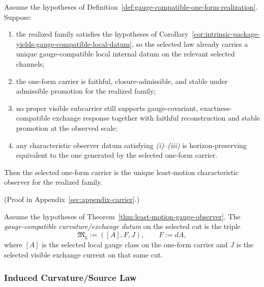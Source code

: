 \begin{theorem}
\label{thm:least-motion-gauge-observer}
Assume the hypotheses of
Definition~\ref{def:gauge-compatible-one-form-realization}. Suppose:
\begin{enumerate}[label=(\roman*),itemsep=0.2em]
\item the realized family satisfies the hypotheses of
      Corollary~\ref{cor:intrinsic-package-yields-gauge-compatible-local-datum},
      so the selected law already carries a unique gauge-compatible local
      internal datum on the relevant selected channels;
\item the one-form carrier is faithful, closure-admissible, and stable under
      admissible promotion for the realized family;
\item no proper visible subcarrier still supports gauge-covariant,
      exactness-compatible exchange response together with faithful
      reconstruction and stable promotion at the observed scale;
\item any characteristic observer datum satisfying \emph{(i)}--\emph{(iii)} is
      horizon-preserving equivalent to the one generated by the selected
      one-form carrier.
\end{enumerate}
Then the selected one-form carrier is the unique least-motion characteristic
observer for the realized family.
\end{theorem}

(Proof in Appendix~\ref{sec:appendix-carrier}.)

\begin{definition}
\label{def:gauge-compatible-curvature-source-datum}
Assume the hypotheses of
Theorem~\ref{thm:least-motion-gauge-observer}. The
\emph{gauge-compatible curvature/exchange datum} on the selected cut is the
triple
\[
\mathfrak M_{\mathrm g}:=([A],F,J),
\qquad
F:=dA,
\]
where \([A]\) is the selected local gauge class on the one-form carrier and
\(J\) is the selected visible exchange current on that same cut.
\end{definition}

\subsubsection{Induced Curvature/Source Law}


